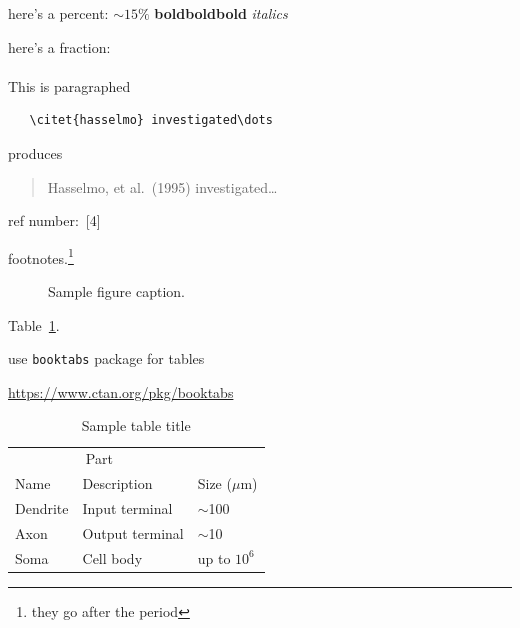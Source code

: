 \documentclass{article}
\begin{document}
here's a percent: $\sim$$15\%$
\textbf{boldboldbold}
\emph{italics}

here's a fraction: 

\paragraph{}This is paragraphed
\begin{verbatim}
   \citet{hasselmo} investigated\dots
\end{verbatim}
produces
\begin{quote}
  Hasselmo, et al.\ (1995) investigated\dots
\end{quote}

ref number:\ [4]

footnotes.\footnote{they go after the period}

\begin{figure}[h]
  \centering
  \fbox{\rule[-.5cm]{0cm}{4cm} \rule[-.5cm]{4cm}{0cm}}
  \caption{Sample figure caption.}
\end{figure}

Table~\ref{sample-table}.

use \verb+booktabs+ package for tables
\begin{center}
  \url{https://www.ctan.org/pkg/booktabs}
\end{center}

\begin{table}[t]
  \caption{Sample table title}
  \label{sample-table}
  \centering
  \begin{tabular}{lll}
    \toprule
    \multicolumn{2}{c}{Part}                   \\
    \cmidrule{1-2}
    Name     & Description     & Size ($\mu$m) \\
    \midrule
    Dendrite & Input terminal  & $\sim$100     \\
    Axon     & Output terminal & $\sim$10      \\
    Soma     & Cell body       & up to $10^6$  \\
    \bottomrule
  \end{tabular}
\end{table}
\end{document}
